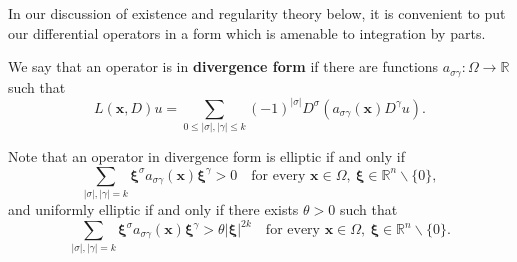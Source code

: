 In our discussion of existence and regularity theory below, it is convenient to put our differential operators in a form which is amenable to integration by parts.

\begin{Definition}
\label{def:general-divergence-form-operator}
We say that an operator is in \textbf{divergence form} if there are functions $a_{\sigma\gamma}:\Omega\to\mathbb{R}$ such that
\begin{equation}\label{eq:general-even-order-divergence-form-definition}
L(\bm{x},D)u=\sum_{0\leq|\sigma|,|\gamma|\leq k}(-1)^{|\sigma|}D^\sigma(a_{\sigma\gamma}(\bm{x})D^\gamma u).
\end{equation}

\end{Definition}

\begin{Remark}
\label{rem:divergence-form-ellipticity-symbol}
Note that an operator in divergence form is elliptic if and only if
\begin{equation}\label{eq:divergence-form-ellipticity-symbol-condition}
\sum_{|\sigma|,|\gamma|=k}\bm{\xi}^\sigma a_{\sigma\gamma}(\bm{x})\bm{\xi}^\gamma>0\quad\text{for every }\bm{x}\in\Omega,\ \bm{\xi}\in\mathbb{R}^n\backslash\{0\},
\end{equation}
and uniformly elliptic if and only if there exists $\theta>0$ such that
\begin{equation}\label{eq:divergence-form-uniform-ellipticity-condition}
\sum_{|\sigma|,|\gamma|=k}\bm{\xi}^\sigma a_{\sigma\gamma}(\bm{x})\bm{\xi}^\gamma>\theta|\bm{\xi}|^{2k}\quad\text{for every }\bm{x}\in\Omega,\ \bm{\xi}\in\mathbb{R}^n\backslash\{0\}.
\end{equation}

\end{Remark}
